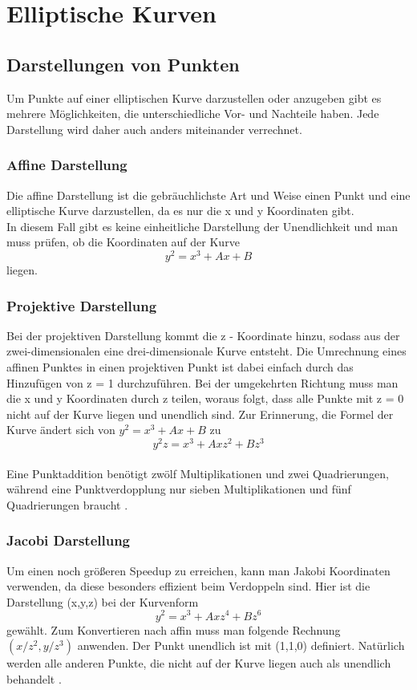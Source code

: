 \chapter{Elliptische Kurven}



\section{Darstellungen von Punkten}
Um Punkte auf einer elliptischen Kurve darzustellen oder anzugeben gibt es mehrere Möglichkeiten, die unterschiedliche Vor- und Nachteile haben. Jede Darstellung wird daher auch anders miteinander verrechnet.
\subsection{Affine Darstellung}
Die affine Darstellung ist die gebräuchlichste Art und Weise einen Punkt und eine elliptische Kurve darzustellen, da es nur die x und y Koordinaten gibt.\\
In diesem Fall gibt es keine einheitliche Darstellung der Unendlichkeit und man muss prüfen, ob die Koordinaten auf der Kurve \[y^2 = x^3 + Ax + B\] liegen.
\subsection{Projektive Darstellung}
Bei der projektiven Darstellung kommt die z - Koordinate hinzu, sodass aus der zwei-dimensionalen eine drei-dimensionale Kurve entsteht. Die Umrechnung eines affinen Punktes in einen projektiven Punkt ist dabei einfach durch das Hinzufügen von z = 1 durchzuführen. Bei der umgekehrten Richtung muss man die x und y Koordinaten durch z teilen, woraus folgt, dass alle Punkte mit z = 0 nicht auf der Kurve liegen und unendlich sind. Zur Erinnerung, die Formel der Kurve ändert sich von \(y^2 = x^3 + Ax + B\) zu \[y^2z = x^3 + Axz^2 + Bz^3\]\\
Eine Punktaddition benötigt zwölf Multiplikationen und zwei Quadrierungen, während eine Punktverdopplung nur sieben Multiplikationen und fünf Quadrierungen braucht \cite{Washington2003}.
\\
\subsection{Jacobi Darstellung}
Um einen noch größeren Speedup zu erreichen, kann man Jakobi Koordinaten verwenden, da diese besonders effizient beim Verdoppeln sind. Hier ist die Darstellung (x,y,z) bei der Kurvenform \[y^2 = x^3 + Axz^4 + Bz^6\] gewählt. Zum Konvertieren nach affin muss man folgende Rechnung \((x/z^2, y/z^3)\) anwenden. Der Punkt unendlich ist mit (1,1,0) definiert. Natürlich werden alle anderen Punkte, die nicht auf der Kurve liegen auch als unendlich behandelt \cite{Washington2003}.

